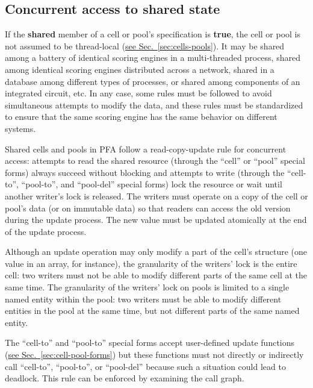 \documentclass{article}
\newcommand{\PFAc}{\ttfamily\bfseries}
\theoremstyle{definition}
\begin{document}
\hypertarget{hsec:concurrent}{}
\subsection{Concurrent access to shared state}
\label{sec:concurrent}

If the {\PFAc shared} member of a cell or pool's specification is {\PFAc true}, the cell or pool is not assumed to be thread-local (\hyperlink{hsec:cells-pools}{see Sec.~\ref{sec:cells-pools}}).  It may be shared among a battery of identical scoring engines in a multi-threaded process, shared among identical scoring engines distributed across a network, shared in a database among different types of processes, or shared among components of an integrated circuit, etc.  In any case, some rules must be followed to avoid simultaneous attempts to modify the data, and these rules must be standardized to ensure that the same scoring engine has the same behavior on different systems.

Shared cells and pools in PFA follow a read-copy-update rule for concurrent access: attempts to read the shared resource (through the ``cell'' or ``pool'' special forms) always succeed without blocking and attempts to write (through the ``cell-to'', ``pool-to'', and ``pool-del'' special forms) lock the resource or wait until another writer's lock is released.  The writers must operate on a copy of the cell or pool's data (or on immutable data) so that readers can access the old version during the update process.  The new value must be updated atomically at the end of the update process.

Although an update operation may only modify a part of the cell's structure (one value in an array, for instance), the granularity of the writers' lock is the entire cell: two writers must not be able to modify different parts of the same cell at the same time.  The granularity of the writers' lock on pools is limited to a single named entity within the pool: two writers must be able to modify different entities in the pool at the same time, but not different parts of the same named entity.

The ``cell-to'' and ``pool-to'' special forms accept user-defined update functions (\hyperlink{hsec:cell-pool-forms}{see Sec.~\ref{sec:cell-pool-forms}}) but these functions must not directly or indirectly call ``cell-to'', ``pool-to'', or ``pool-del'' because such a situation could lead to deadlock.  This rule can be enforced by examining the call graph.

\hypertarget{hsec:exceptions}{}
\end{document}
